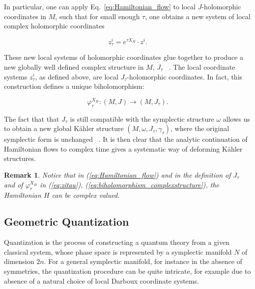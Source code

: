 \documentclass[a4paper,11pt]{article}
\newtheorem{remark}{Remark}
\begin{document}
In particular, one can apply Eq.~\eqref{eq:Hamiltonian_flow} to local $J$-holomorphic coordinates in $M$, such that for small enough $\tau$, one obtains a new system of local complex holomorphic coordinates

\begin{equation}
\label{eq:zitau}
z^{i}_{\tau}=e^{\tau X_{H}}\cdot z^{i}.
\end{equation}

These new local systems of holomorphic coordinates glue together to produce a new globally well defined complex structure in $M$, $J_{\tau}$ ~\cite{MouraoPimentelComplextime}. The local coordinate systems $z^{i}_{\tau}$, as defined above, are local $J_{\tau}$-holomorphic coordinates. In fact, this construction defines a unique biholomorphism:

\begin{equation}
   \varphi^{X_H}_{\tau}:(M,J)\rightarrow (M,J_{\tau}).
   \label{eq:biholomorphism_complexstructure}
\end{equation}

The fact that that $J_\tau$ is still compatible with the symplectic structure $\omega$ allows us to  
obtain a new global Kähler structure $(M,\omega,J_{\tau},\gamma_{\tau})$, where the original symplectic form is unchanged ~\cite{MouraoPimentelComplextime}. 
It is then clear that the analytic continuation of Hamiltonian flows to complex time gives  a systematic way of deforming Kähler structures.

\begin{remark}
Notice that in (\ref{eq:Hamiltonian_flow}) and in the definition of $J_\tau$ and of
$\varphi^{X_H}_{\tau}$ in (\ref{eq:zitau}), (\ref{eq:biholomorphism_complexstructure}),
the Hamiltonian $H$ can be complex valued.



\end{remark}

\subsection{Geometric Quantization}
\label{sub:geometric_quantization}

Quantization is the process of constructing a quantum theory from a given classical system, whose phase space is represented by a symplectic manifold $N$ of dimension $2n$. For a general symplectic manifold, for instance in the absence of symmetries, the quantization procedure can be quite intricate, for example due to absence of a natural choice of local Darboux coordinate systems. 
\end{document}
